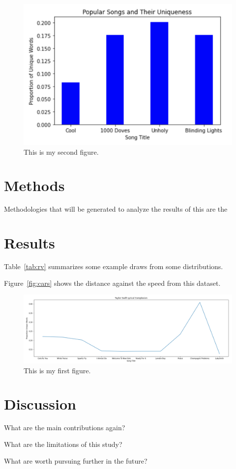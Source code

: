\documentclass[12pt]{article}
\begin{document}
\begin{figure}[htbp]
  \centering
  \includegraphics[width=\textwidth]{graph 2.png}
  \caption{This is my second figure.}
  \label{fig:graph 2}
\end{figure}




\section{Methods}
\label{sec:meth}

Methodologies that will be generated to analyze the results of this are the 


\section{Results}
\label{sec:resu}

Table~\ref{tab:rv} summarizes some example draws from some distributions.


Figure~\ref{fig:cars} shows the distance against the speed from this dataset.


\begin{figure}[htbp]
  \centering
  \includegraphics[width=\textwidth]{graph.png}
  \caption{This is my first figure.}
  \label{fig:graph}
\end{figure}

\section{Discussion}
\label{sec:disc}

What are the main contributions again?

What are the limitations of this study?

What are worth pursuing further in the future?





\end{document}
